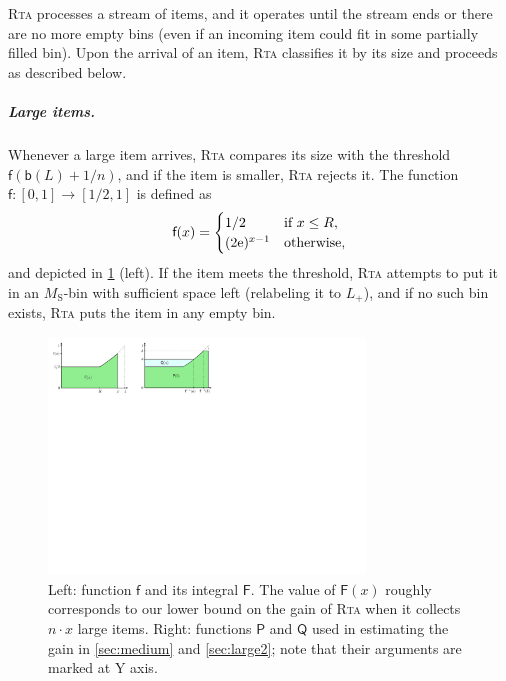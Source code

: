 \documentclass[a4paper,USenglish,cleveref]{lipics-v2019}
\newcommand{\e}{\mathrm{e}}
\newcommand{\R}{\ensuremath{R}}
\newcommand{\LG}{\ensuremath{L}\xspace}
\newcommand{\M}{\ensuremath{M_\mathrm{S}}\xspace}
\newcommand{\LT}{\ensuremath{L_+}\xspace}
\newcommand{\f}{\textsf{f}}
\newcommand{\fintegral}{\textsf{F}}
\newcommand{\water}{\textsf{Q}}
\newcommand{\cutintegral}{\textsf{P}}
\newcommand{\B}{\textsf{b}}
\newcommand{\ALG}{\textsc{Rta}\xspace}
\begin{document}


\ALG processes a stream of items, and it operates until the stream ends or there
are no more empty bins (even if an incoming item could fit in some partially
filled bin). Upon the arrival of an item, \ALG classifies it by its size and
proceeds as described below. 

\subparagraph{Large items.}

Whenever a large item arrives, \ALG compares its size with the threshold
$\f(\B(\LG) + 1/n)$, and if the item is smaller, \ALG rejects it.
The function $\f: [0,1] \to [1/2,1]$ is defined as 
\begin{equation}
\label{eq:f-definition}
   \f(x) =
\begin{cases}
  1/2 &\mbox{if } x \leq \R, \\
  (2\e)^{x-1} & \textnormal{otherwise,}
\end{cases}
\end{equation}
and depicted in \cref{fig:def-fpq} (left).
If the item meets the threshold, \ALG attempts to put it in an \M-bin
with sufficient space left (relabeling it to \LT), and if no
such bin exists, \ALG puts the item in any empty bin.

\begin{figure}[t]
   \centering
   \includegraphics[width=0.75\textwidth]{images/pq.pdf}
   \caption{Left: function $\f$ and its integral $\fintegral$. 
   The value of $\fintegral(x)$ roughly corresponds to our lower bound on the 
   gain of \ALG when it collects $n \cdot x$ large items.
   Right: functions $\cutintegral$ and $\water$ used in estimating the gain 
   in \cref{sec:medium} and \cref{sec:large2}; note that their arguments are marked at Y axis.}
   \label{fig:def-fpq} 
\end{figure}
\end{document}
